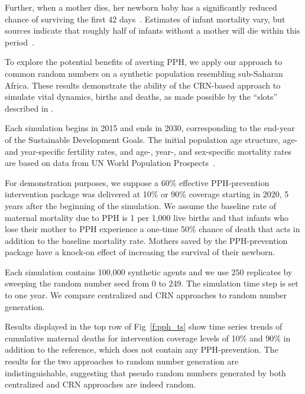 \documentclass[10pt,letterpaper]{article}
\begin{document}
Further, when a mother dies, her newborn baby has a significantly reduced chance of surviving the first 42 days~\cite{nguyen_risk_2019}. Estimates of infant mortality vary, but sources indicate that roughly half of infants without a mother will die within this period~\cite{finlay_effects_2015}.

To explore the potential benefits of averting PPH, we apply our approach to common random numbers on a synthetic population resembling sub-Saharan Africa. These results demonstrate the ability of the CRN-based approach to simulate vital dynamics, births and deaths, as made possible by the ``slots'' described in .

Each simulation begins in 2015 and ends in 2030, corresponding to the end-year of the Sustainable Development Goals. The initial population age structure, age- and year-specific fertility rates, and age-, year-, and sex-specific mortality rates are based on data from UN World Population Prospects~\cite{wpp}.

For demonstration purposes, we suppose a 60\% effective PPH-prevention intervention package was delivered at 10\% or 90\% coverage starting in 2020, 5 years after the beginning of the simulation. We assume the baseline rate of maternal mortality due to PPH is 1 per 1,000 live births and that infants who lose their mother to PPH experience a one-time 50\% chance of death that acts in addition to the baseline mortality rate. Mothers saved by the PPH-prevention package have a knock-on effect of increasing the survival of their newborn.

Each simulation contains 100,000 synthetic agents and we use $250$ replicates by sweeping the random number seed from 0 to 249. The simulation time step is set to one year. We compare centralized and CRN approaches to random number generation.

Results displayed in the top row of Fig~\ref{f:pph_ts} show time series trends of cumulative maternal deaths for intervention coverage levels of 10\% and 90\% in addition to the reference, which does not contain any PPH-prevention. The results for the two approaches to random number generation are indistinguishable, suggesting that pseudo random numbers generated by both centralized and CRN approaches are indeed random.
\end{document}
